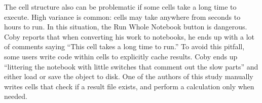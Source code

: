 The cell structure also can be problematic if some cells take a long time to
execute. High variance is common: cells may take anywhere from seconds to
hours to run. In this situation, the Run Whole Notebook button is dangerous.
Coby reports that when converting his work to notebooks, he
ends up with a lot of comments saying ``This cell takes a long time to run.''
To avoid this pitfall, some users write code within cells to explicitly cache results.
Coby ends up ``littering the notebook with little switches that comment out the
slow parts'' and either load or save the object to disk. One of the authors of this study manually writes cells that check if a result file exists, and perform a calculation only when needed.








